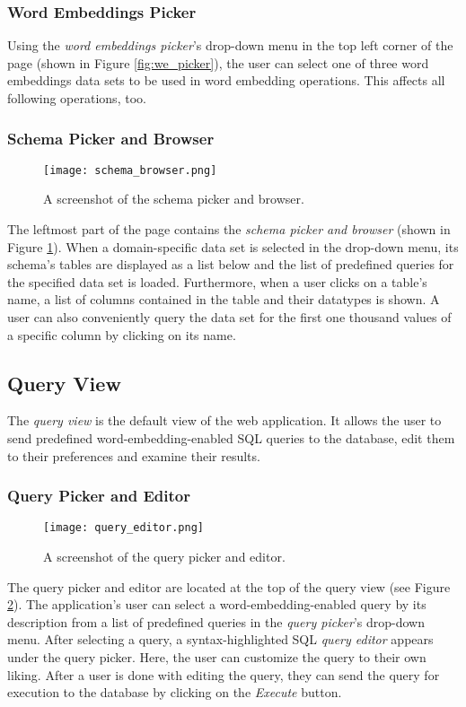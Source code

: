 \subsubsection{Word Embeddings Picker}
Using the \textit{word embeddings picker}'s drop-down menu in the top left corner of the page (shown in Figure \ref{fig:we_picker}), the user can select one of three word embeddings data sets to be used in word embedding operations. This affects all following operations, too.

\subsubsection{Schema Picker and Browser}
\begin{figure}
	\centering\texttt{[image: schema\_browser.png]}
	\caption{A screenshot of the schema picker and browser.}
	\label{fig:schema_picker}
\end{figure}
The leftmost part of the page contains the \textit{schema picker and browser} (shown in Figure \ref{fig:schema_picker}). When a domain-specific data set is selected in the drop-down menu, its schema's tables are displayed as a list below and the list of predefined queries for the specified data set is loaded. Furthermore, when a user clicks on a table's name, a list of columns contained in the table and their datatypes is shown. A user can also conveniently query the data set for the first one thousand values of a specific column by clicking on its name.


\subsection{Query View}
The \textit{query view} is the default view of the web application. It allows the user to send predefined word-embedding-enabled SQL queries to the database, edit them to their preferences and examine their results.

\subsubsection{Query Picker and Editor}
\begin{figure}
	\centering\texttt{[image: query\_editor.png]}
	\caption{A screenshot of the query picker and editor.}
	\label{fig:query_picker_editor}
\end{figure}
The query picker and editor are located at the top of the query view (see Figure \ref{fig:query_picker_editor}). The application's user can select a word-embedding-enabled query by its description from a list of predefined queries in the \textit{query picker}'s drop-down menu. After selecting a query, a syntax-highlighted SQL \textit{query editor} appears under the query picker. Here, the user can customize the query to their own liking. After a user is done with editing the query, they can send the query for execution to the database by clicking on the \textit{Execute} button.

